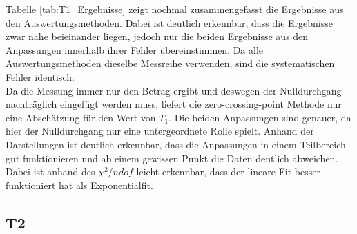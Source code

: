 \documentclass[12pt,a4paper]{article}
\begin{document}
Tabelle \ref{tab:T1_Ergebnisse} zeigt nochmal zusammengefasst die Ergebnisse aus den Auswertungsmethoden. Dabei ist deutlich erkennbar, dass die Ergebnisse zwar nahe beieinander liegen, jedoch nur die beiden Ergebnisse aus den Anpassungen innerhalb ihrer Fehler übereinstimmen. Da alle Auswertungsmethoden dieselbe Messreihe verwenden, sind die systematischen Fehler identisch.\\
Da die Messung immer nur den Betrag ergibt und deswegen der Nulldurchgang nachträglich eingefügt werden muss, liefert die zero-crossing-point Methode nur eine Abschätzung für den Wert von $T_1$. Die beiden Anpassungen sind genauer, da hier der Nulldurchgang nur eine untergeordnete Rolle spielt. Anhand der Darstellungen ist deutlich erkennbar, dass die Anpassungen in einem Teilbereich gut funktionieren und ab einem gewissen Punkt die Daten deutlich abweichen. Dabei ist anhand des $\chi ^2 /ndof$ leicht erkennbar, dass der lineare Fit besser funktioniert hat als Exponentialfit.


\subsection{T2}
\end{document}
